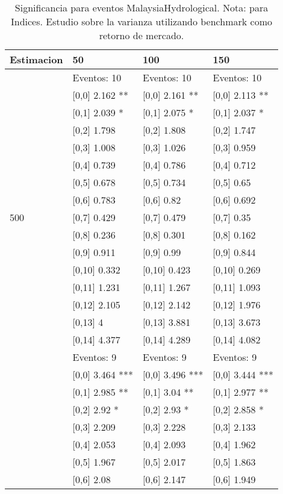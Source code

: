 \begin{table}

\caption{Significancia para eventos MalaysiaHydrological. Nota: para Indices. Estudio sobre la varianza utilizando benchmark como retorno de mercado.}
\centering
\begin{tabular}[t]{llll}
\toprule
Estimacion & 50 & 100 & 150\\
\midrule
 & Eventos:  10 & Eventos:  10 & Eventos:  10\\
 & {}[0,0] 2.162 ** & {}[0,0] 2.161 ** & {}[0,0] 2.113 **\\
 & {}[0,1] 2.039 * & {}[0,1] 2.075 * & {}[0,1] 2.037 *\\
 & {}[0,2] 1.798 & {}[0,2] 1.808 & {}[0,2] 1.747\\
 & {}[0,3] 1.008 & {}[0,3] 1.026 & {}[0,3] 0.959\\
\addlinespace
 & {}[0,4] 0.739 & {}[0,4] 0.786 & {}[0,4] 0.712\\
 & {}[0,5] 0.678 & {}[0,5] 0.734 & {}[0,5] 0.65\\
 & {}[0,6] 0.783 & {}[0,6] 0.82 & {}[0,6] 0.692\\
500 & {}[0,7] 0.429 & {}[0,7] 0.479 & {}[0,7] 0.35\\
 & {}[0,8] 0.236 & {}[0,8] 0.301 & {}[0,8] 0.162\\
\addlinespace
 & {}[0,9] 0.911 & {}[0,9] 0.99 & {}[0,9] 0.844\\
 & {}[0,10] 0.332 & {}[0,10] 0.423 & {}[0,10] 0.269\\
 & {}[0,11] 1.231 & {}[0,11] 1.267 & {}[0,11] 1.093\\
 & {}[0,12] 2.105 & {}[0,12] 2.142 & {}[0,12] 1.976\\
 & {}[0,13] 4 & {}[0,13] 3.881 & {}[0,13] 3.673\\
\addlinespace
 & {}[0,14] 4.377 & {}[0,14] 4.289 & {}[0,14] 4.082\\
 & Eventos:  9 & Eventos:  9 & Eventos:  9\\
 & {}[0,0] 3.464 *** & {}[0,0] 3.496 *** & {}[0,0] 3.444 ***\\
 & {}[0,1] 2.985 ** & {}[0,1] 3.04 ** & {}[0,1] 2.977 **\\
 & {}[0,2] 2.92 * & {}[0,2] 2.93 * & {}[0,2] 2.858 *\\
\addlinespace
 & {}[0,3] 2.209 & {}[0,3] 2.228 & {}[0,3] 2.133\\
 & {}[0,4] 2.053 & {}[0,4] 2.093 & {}[0,4] 1.962\\
 & {}[0,5] 1.967 & {}[0,5] 2.017 & {}[0,5] 1.863\\
 & {}[0,6] 2.08 & {}[0,6] 2.147 & {}[0,6] 1.949\\

\end{tabular}
\end{table}
